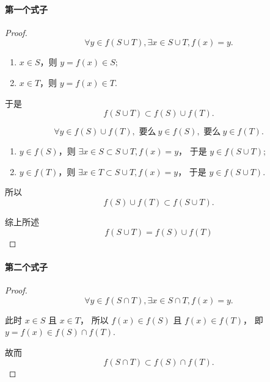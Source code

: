 \paragraph{第一个式子} %
\label{par:第一个式子}
\begin{proof}
    \begin{equation}
        \forall y \in f(S \cup T),
        \exists x \in S \cup T,
        f(x) = y.
    \end{equation}
    \begin{enumerate}
        \item $x \in S$，则 $y = f(x) \in S;$
        \item $x \in T$，则 $y = f(x) \in T.$
    \end{enumerate}
    于是
    \begin{equation}
        f(S \cup T) \subset f(S) \cup f(T).
    \end{equation}

    \begin{equation}
        \forall y \in f(S) \cup f(T),
        \text{ 要么}\: y \in f(S),
        \text{ 要么}\: y \in f(T).
    \end{equation}
    \begin{enumerate}
        \item $y \in f(S)$，则 $\exists x \in S \subset S \cup T, f(x) = y$，
            于是 $y \in f(S \cup T);$
        \item $y \in f(T)$，则 $\exists x \in T \subset S \cup T, f(x) = y$，
            于是 $y \in f(S \cup T).$
    \end{enumerate}
    所以
    \begin{equation}
        f(S) \cup f(T) \subset f(S \cup T).
    \end{equation}

    综上所述
    \begin{equation}
        f(S \cup T) = f(S) \cup f(T)
    \end{equation}
\end{proof}

\paragraph{第二个式子} %
\label{par:第二个式子}
\begin{proof}
    \begin{equation}
        \forall y \in f(S \cap T),
        \exists x \in S \cap T,
        f(x) = y.
    \end{equation}

    此时 $x \in S$ 且 $x \in T$，
    所以 $f(x) \in f(S)$ 且 $f(x) \in f(T)$，
    即 $y = f(x) \in f(S) \cap f(T)$.

    故而
    \begin{equation}
        f(S \cap T) \subset f(S) \cap f(T).
    \end{equation}
\end{proof}

